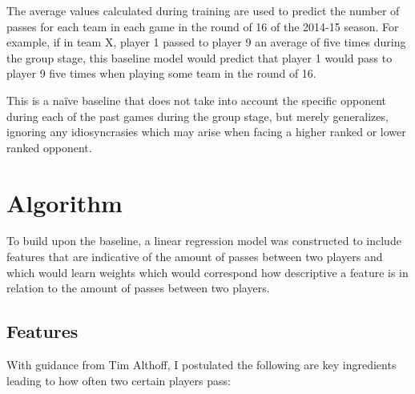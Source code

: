 \documentclass[11pt,letterpaper]{article}
\begin{document}
The average values calculated during training are used to predict the number of passes for each team in each game in the round of 16 of the 2014-15 season. For example, if in team X, player 1 passed to player 9 an average of five times during the group stage, this baseline model would predict that player 1 would pass to player 9 five times when playing some team in the round of 16.

This is a naïve baseline that does not take into account the specific opponent during each of the past games during the group stage, but merely generalizes, ignoring any idiosyncrasies which may arise when facing a higher ranked or lower ranked opponent. 

\section{Algorithm}

To build upon the baseline, a linear regression model was constructed to include features that are indicative of the amount of passes between two players and which would learn weights which would correspond how descriptive a feature is in relation to the amount of passes between two players.

\subsection{Features}
With guidance from Tim Althoff, I postulated the following are key ingredients leading to how often two certain players pass:
\end{document}
